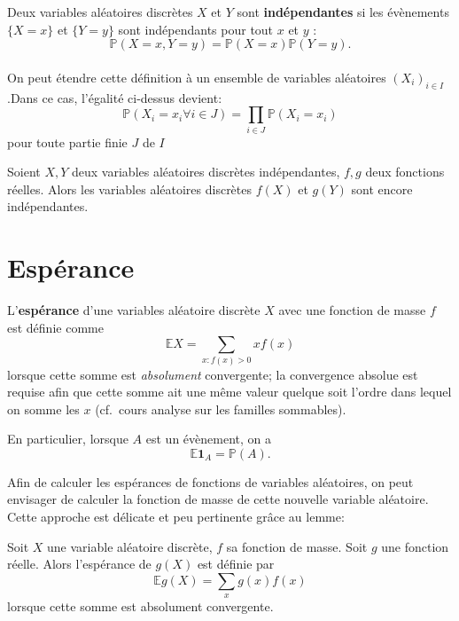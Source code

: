\documentclass[]{book}
\theoremstyle{definition}
\theoremstyle{definition}
\theoremstyle{definition}
\theoremstyle{remark}
\let\BeginKnitrBlock\begin \let\EndKnitrBlock\end
\begin{document}
\BeginKnitrBlock{definition}
\protect\hypertarget{def:unnamed-chunk-3}{}{\label{def:unnamed-chunk-3} }Deux variables aléatoires discrètes \(X\) et \(Y\) sont \textbf{indépendantes} si les évènements \(\lbrace X=x \rbrace\) et \(\lbrace Y=y \rbrace\) sont indépendants pour tout \(x\) et \(y\) :
\[\mathbb{P}(X=x,Y=y) = \mathbb{P}(X=x) \mathbb{P}(Y=y) .\]\\
On peut étendre cette définition à un ensemble de variables aléatoires \((X_i)_{i \in I}\).Dans ce cas, l'égalité ci-dessus devient:
\[ \mathbb{P}(X_i = x_i \forall i \in J) = \prod_{i \in J} \mathbb{P}(X_i = x_i)\]
pour toute partie finie \(J\) de \(I\)
\EndKnitrBlock{definition}

\BeginKnitrBlock{theorem}
\protect\hypertarget{thm:unnamed-chunk-4}{}{\label{thm:unnamed-chunk-4} }Soient \(X,Y\) deux variables aléatoires discrètes indépendantes, \(f,g\) deux fonctions réelles. Alors les variables aléatoires discrètes \(f(X)\) et \(g(Y)\) sont encore indépendantes.
\EndKnitrBlock{theorem}

\hypertarget{esperance}{%
\section{Espérance}\label{esperance}}

\BeginKnitrBlock{definition}
\protect\hypertarget{def:unnamed-chunk-5}{}{\label{def:unnamed-chunk-5} }L'\textbf{espérance} d'une variables aléatoire discrète \(X\) avec une fonction de masse \(f\) est définie comme
\[ \mathbb{E} X = \sum_{x : f(x)>0} x f(x) \]
lorsque cette somme est \emph{absolument} convergente; la convergence absolue est requise afin que cette somme ait une même valeur quelque soit l'ordre dans lequel on somme les \(x\) (cf.~cours analyse sur les familles sommables).
\EndKnitrBlock{definition}

En particulier, lorsque \(A\) est un évènement, on a
\[\mathbb{E} \mathbf{1}_A = \mathbb{P}(A).\]

Afin de calculer les espérances de fonctions de variables aléatoires, on peut envisager de calculer la fonction de masse de cette nouvelle variable aléatoire. Cette approche est délicate et peu pertinente grâce au lemme:
\BeginKnitrBlock{lemma}
\protect\hypertarget{lem:unnamed-chunk-6}{}{\label{lem:unnamed-chunk-6} }Soit \(X\) une variable aléatoire discrète, \(f\) sa fonction de masse. Soit \(g\) une fonction réelle. Alors l'espérance de \(g(X)\) est définie par
\[
\mathbb{E} g(X) = \sum_{x} g(x) f(x)
\]
lorsque cette somme est absolument convergente.
\EndKnitrBlock{lemma}
\end{document}
